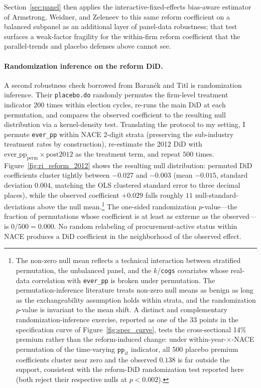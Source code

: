 \documentclass[11pt]{article}
\begin{document}


Section~\ref{sec:panel} then applies the interactive-fixed-effects bias-aware estimator of Armstrong, Weidner, and Zeleneev \cite{ArmstrongWeidnerZeleneev2024} to this same reform coefficient on a balanced subpanel as an additional layer of panel-data robustness; that test surfaces a weak-factor fragility for the within-firm reform coefficient that the parallel-trends and placebo defenses above cannot see.

\paragraph{Randomization inference on the reform DiD.} A second robustness check borrowed from Baran\'{e}k and Titl \cite{BaranekTitl2024} is randomization inference. Their \texttt{placebo.do} randomly permutes the firm-level treatment indicator 200 times within election cycles, re-runs the main DiD at each permutation, and compares the observed coefficient to the resulting null distribution via a kernel-density test. Translating the protocol to my setting, I permute \texttt{ever\_pp} within NACE 2-digit strata (preserving the sub-industry treatment rates by construction), re-estimate the 2012 DiD with $\text{ever\_pp}_{\text{perm}} \times \text{post2012}$ as the treatment term, and repeat $500$ times. Figure~\ref{fig:ri_reform_2012} shows the resulting null distribution: permuted DiD coefficients cluster tightly between $-0.027$ and $-0.003$ (mean $-0.015$, standard deviation $0.004$, matching the OLS clustered standard error to three decimal places), while the observed coefficient $+0.029$ falls roughly $11$ null-standard-deviations above the null mean.\footnote{The non-zero null mean reflects a technical interaction between stratified permutation, the unbalanced panel, and the $k$/\texttt{cogs} covariates whose real-data correlation with \texttt{ever\_pp} is broken under permutation. The permutation-inference literature treats non-zero null means as benign as long as the exchangeability assumption holds within strata, and the randomization $p$-value is invariant to the mean shift. A distinct and complementary randomization-inference exercise, reported as one of the 33 points in the specification curve of Figure~\ref{fig:spec_curve}, tests the cross-sectional 14\% premium rather than the reform-induced change: under within-year-$\times$-NACE permutation of the time-varying $\texttt{pp}_{it}$ indicator, all 500 placebo premium coefficients cluster near zero and the observed $0.138$ is far outside the support, consistent with the reform-DiD randomization test reported here (both reject their respective nulls at $p < 0.002$).} The one-sided randomization $p$-value---the fraction of permutations whose coefficient is at least as extreme as the observed---is $0 / 500 = 0.000$. No random relabeling of procurement-active status within NACE produces a DiD coefficient in the neighborhood of the observed effect.
\end{document}
